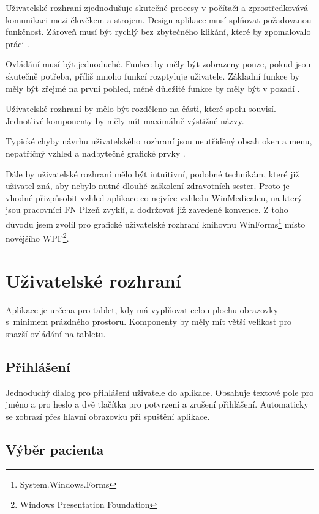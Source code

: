 Uživatelské rozhraní zjednodušuje skutečné procesy v počítači a zprostředkovává komunikaci mezi člověkem a strojem. Design aplikace musí splňovat požadovanou funkčnost. Zároveň musí být rychlý bez zbytečného klikání, které by zpomalovalo práci \cite{helander}.

Ovládání musí být jednoduché. Funkce by měly být zobrazeny pouze, pokud jsou skutečně potřeba, příliš mnoho funkcí rozptyluje uživatele. Základní funkce by měly být zřejmé na první pohled, méně důležité funkce by měly být v pozadí \cite{saffer}. 

Uživatelské rozhraní by mělo být rozděleno na části, které spolu souvisí. Jednotlivé komponenty by měly mít maximálně výstižné názvy.

Typické chyby návrhu uživatelského rozhraní jsou neutříděný obsah oken a menu, nepatřičný vzhled a nadbytečné grafické prvky \cite{sojka}.

Dále by uživatelské rozhraní mělo být intuitivní, podobné technikám, které již uživatel zná, aby nebylo nutné dlouhé zaškolení zdravotních sester. Proto je vhodné přizpůsobit vzhled aplikace co nejvíce vzhledu WinMedicalcu, na který jsou pracovníci FN Plzeň zvyklí, a dodržovat již zavedené konvence. Z toho důvodu jsem zvolil pro grafické uživatelské rozhraní knihovnu WinForms\footnote{System.Windows.Forms} místo novějšího WPF\footnote{Windows Presentation Foundation}.


\section{Uživatelské rozhraní}

Aplikace je určena pro tablet, kdy má vyplňovat celou plochu obrazovky s~minimem prázdného prostoru. Komponenty by měly mít větší velikost pro snazší ovládání na tabletu.

\subsection{Přihlášení}

Jednoduchý dialog pro přihlášení uživatele do aplikace. Obsahuje textové pole pro jméno a pro heslo a dvě tlačítka pro potvrzení a zrušení přihlášení. Automaticky se zobrazí přes hlavní obrazovku při spuštění aplikace.

\subsection{Výběr pacienta}


